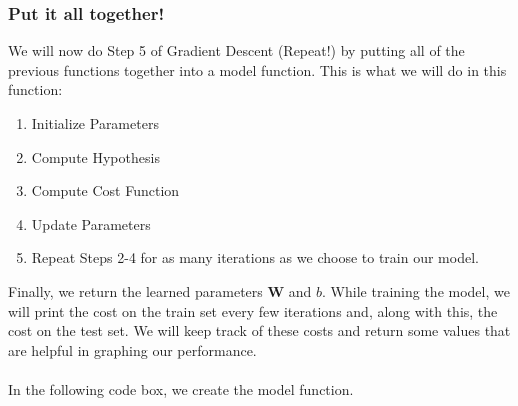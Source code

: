 \documentclass{article}
\begin{document}
\subsubsection{Put it all together!}
We will now do Step 5 of Gradient Descent (Repeat!) by putting all of the previous functions together into a model function. This is what we will do in this function:
\begin{enumerate}
    \item Initialize Parameters
    \item Compute Hypothesis
    \item Compute Cost Function
    \item Update Parameters
    \item Repeat Steps 2-4 for as many iterations as we choose to train our model.
\end{enumerate}
Finally, we return the learned parameters $\textbf{W}$ and $b$. While training the model, we will print the cost on the train set every few iterations and, along with this, the cost on the test set. We will keep track of these costs and return some values that are helpful in graphing our performance.
\\
\\
In the following code box, we create the model function.
\end{document}
